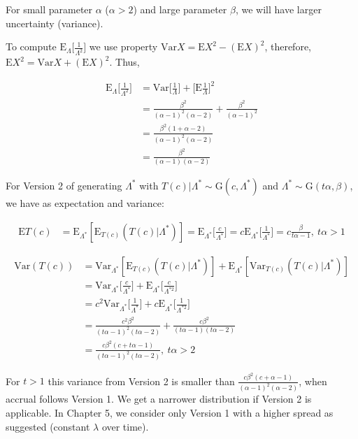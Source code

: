 For small parameter $\alpha$ ($\alpha>2$) and large parameter $\beta$, we will have larger uncertainty (variance).

To compute $\textrm{E}_{\Lambda}\Bigg [\frac{1}{\Lambda^2}\Bigg ]$ we use property $\textrm{Var}X = \textrm{E}X^2-(\textrm{E}X)^2$, therefore, $\textrm{E}X^2 = \textrm{Var}X + (\textrm{E}X)^2$. Thus,

\begin{align*}
\textrm{E}_{\Lambda}\Bigg [\frac{1}{\Lambda^2}\Bigg ] &= \textrm{Var}\Bigg [\frac{1}{\Lambda}\Bigg ] + \Bigg [\textrm{E}\frac{1}{\Lambda}\Bigg ]^2\\
&=\frac{\beta^2}{(\alpha-1)^2(\alpha-2)} + \frac{\beta^2}{(\alpha-1)^2}\\
&=\frac{\beta^2(1+\alpha-2)}{(\alpha-1)^2(\alpha-2)}\\
&=\frac{\beta^2}{(\alpha-1)(\alpha-2)}
\end{align*}

For Version 2 of generating $\Lambda^*$ with $T(c)|\Lambda^*\sim\textrm{G}(c,\Lambda^*)$ and $\Lambda^*\sim \textrm{G}(t\alpha,\beta)$, we have as expectation and variance:


\begin{align*}
\textrm{E}T(c) &= \textrm{E}_{\Lambda^*}[\textrm{E}_{T(c)} (T(c)|\Lambda^*)] = \textrm{E}_{\Lambda^*}\Bigg [\frac{c}{\Lambda^*}\Bigg ] = c \textrm{E}_{\Lambda^*}\Bigg [\frac{1}{\Lambda^*}\Bigg ] = c\frac{\beta}{t\alpha-1}, \ t\alpha>1
\end{align*}

\begin{align*}
\textrm{Var}(T(c)) &= \textrm{Var}_{\Lambda^*}[\textrm{E}_{T(c)} (T(c)|\Lambda^*)] + \textrm{E}_{\Lambda^*}[\textrm{Var}_{T(c)}(T(c)|\Lambda^*)]\\
&=\textrm{Var}_{\Lambda^*}\Bigg [\frac{c}{\Lambda^*}\Bigg ] + \textrm{E}_{\Lambda^*}\Bigg [\frac{c}{\Lambda^{*2}}\Bigg ] \\
&=c^2\textrm{Var}_{\Lambda^*}\Bigg [\frac{1}{\Lambda^*}\Bigg ] + c\textrm{E}_{\Lambda^*}\Bigg [\frac{1}{\Lambda^{*2}}\Bigg ] \\
&=\frac{c^2\beta^2}{(t\alpha-1)^2(t\alpha-2)} + \frac{c\beta^2}{(t\alpha-1)(t\alpha-2)}\\
&=\frac{c\beta^2(c+t\alpha-1)}{(t\alpha-1)^2(t\alpha-2)}, \ t\alpha>2
\end{align*}


For $t>1$ this variance from Version 2 is smaller than $\frac{c\beta^2(c+\alpha-1)}{(\alpha-1)^2(\alpha-2)}$, when accrual follows Version 1. We get a narrower distribution if Version 2 is applicable. In Chapter 5, we consider only Version 1 with a higher spread as \cite{carter2004application} suggested (constant $\lambda$ over time).




